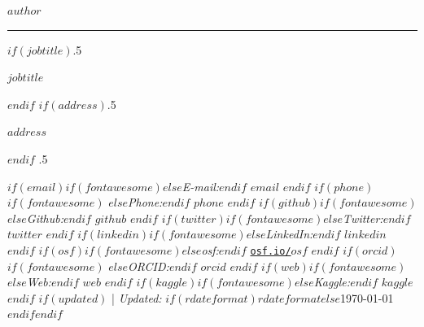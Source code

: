 
\usepackage{datetime}


\usepackage{orcidlink}
\usepackage{academicons}




\centerline{\huge \bf $author$}

\vspace{2 mm}

\hrule

\vspace{2 mm}

$if(jobtitle)$\moveleft.5\hoffset\centerline{$jobtitle$}$endif$
$if(address)$\moveleft.5\hoffset\centerline{$address$}$endif$
\moveleft.5\hoffset\centerline{ $if(email)$$if(fontawesome)$\faEnvelope \hspace{1 mm}$else$\emph{E-mail:}$endif$ \href{mailto:}{\tt $email$} \hspace{1 mm}$endif$ $if(phone)$$if(fontawesome)$ \faPhone \hspace{1 mm}$else$\emph{Phone:}$endif$  $phone$  \hspace{1 mm} $endif$ $if(github)$$if(fontawesome)$\faGithub \hspace{1 mm}$else$\emph{Github:}$endif$ \href{http://github.com/$github$}{\tt $github$} \hspace{1 mm} $endif$  $if(twitter)$$if(fontawesome)$\faTwitter \hspace{1 mm}$else$\emph{Twitter:}$endif$ \href{https:/twitter.com/$twitter$}{\tt $twitter$} \hspace{1 mm} $endif$ $if(linkedin)$$if(fontawesome)$\faLinkedin \hspace{1 mm}$else$\emph{LinkedIn:}$endif$ \href{https://linkedin.com/in/$linkedin$}{\tt $linkedin$} \hspace{1 mm} $endif$ $if(osf)$$if(fontawesome)$\faUnlock \hspace{1 mm}$else$\emph{osf:}$endif$ \href{https:/osf.io/$osf$}{\tt osf.io/$osf$} \hspace{1 mm} $endif$ $if(orcid)$$if(fontawesome)$ \hspace{.5 mm}$else$\emph{ORCID:}$endif$ \href{https://orcid.org/$orcid$}{\tt $orcid$} \hspace{1 mm} $endif$ $if(web)$$if(fontawesome)$\faGlobe \hspace{1 mm}$else$\emph{Web:}$endif$ \href{http://$web$}{\tt $web$}  $endif$ $if(kaggle)$$if(fontawesome)$\faKaggle \hspace{1 mm}$else$\emph{Kaggle:}$endif$ \href{http://kaggle.com/$kaggle$}{\tt $kaggle$} \hspace{1 mm} $endif$   $if(updated)$ | \emph{Updated:} $if(rdateformat)$$rdateformat$$else$\apstylekinda\today$endif$$endif$}

